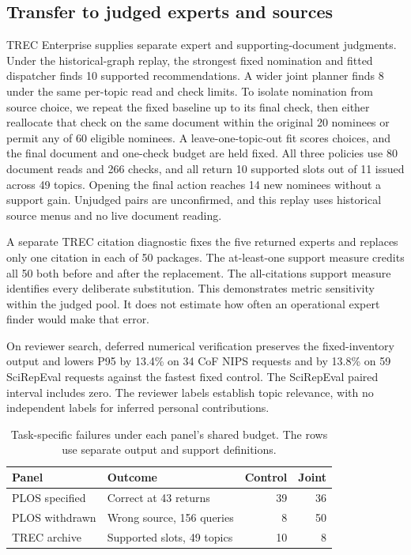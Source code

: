 \documentclass[sigconf,natbib=true,anonymous=true,pbalance=true]{acmart}
\begin{document}
\subsection{Transfer to judged experts and sources}
TREC Enterprise supplies separate expert and supporting-document judgments. Under the historical-graph replay, the strongest fixed nomination and fitted dispatcher finds 10 supported recommendations. A wider joint planner finds 8 under the same per-topic read and check limits. To isolate nomination from source choice, we repeat the fixed baseline up to its final check, then either reallocate that check on the same document within the original 20 nominees or permit any of 60 eligible nominees. A leave-one-topic-out fit scores choices, and the final document and one-check budget are held fixed. All three policies use 80 document reads and 266 checks, and all return 10 supported slots out of 11 issued across 49 topics. Opening the final action reaches 14 new nominees without a support gain. Unjudged pairs are unconfirmed, and this replay uses historical source menus and no live document reading.

A separate TREC citation diagnostic fixes the five returned experts and replaces only one citation in each of 50 packages. The at-least-one support measure credits all 50 both before and after the replacement. The all-citations support measure identifies every deliberate substitution. This demonstrates metric sensitivity within the judged pool. It does not estimate how often an operational expert finder would make that error.

On reviewer search, deferred numerical verification preserves the fixed-inventory output and lowers P95 by 13.4\% on 34 CoF NIPS requests and by 13.8\% on 59 SciRepEval requests against the fastest fixed control. The SciRepEval paired interval includes zero. The reviewer labels establish topic relevance, with no independent labels for inferred personal contributions.

\begin{table}[t]
\centering\small
\caption{Task-specific failures under each panel's shared budget. The rows use separate output and support definitions.}
\label{tab:failure}
\begin{tabular}{@{}p{}p{}rr@{}}
\toprule
Panel & Outcome & Control & Joint \\\midrule
PLOS specified & Correct at 43 returns & 39 & 36 \\
PLOS withdrawn & Wrong source, 156 queries & 8 & 50 \\
TREC archive & Supported slots, 49 topics & 10 & 8 \\
\bottomrule
\end{tabular}
\end{table}
\end{document}
